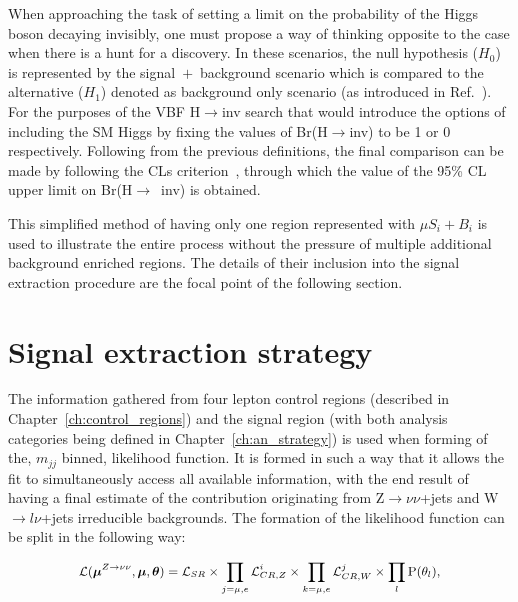 \hspace{10pt} When approaching the task of setting a limit on the probability of the Higgs boson decaying invisibly, one must propose a way of thinking opposite to the case when there is a hunt for a discovery. In these scenarios, the null hypothesis ($H_0$) is represented by the signal~$+$~background scenario which is compared to the alternative ($H_1$) denoted as background only scenario (as introduced in Ref.~\cite{paper:stat_overview}). For the purposes of the VBF H$\rightarrow$inv search that would introduce the options of including the SM Higgs by fixing the values of Br(H$\rightarrow$inv) to be 1 or 0 respectively. Following from the previous definitions, the final comparison can be made by following the CLs criterion~\cite{paper:stat_overview,paper:cls_intro}, through which the value of the 95\% CL upper limit on Br(H$\rightarrow$~inv) is obtained.

\hspace{10pt} This simplified method of having only one region represented with $\mu S_i+B_i$ is used to illustrate the entire process without the pressure of multiple additional background enriched regions. The details of their inclusion into the signal extraction procedure are the focal point of the following section.
\section{Signal extraction strategy}
\hspace{10pt} The information gathered from four lepton control regions (described in Chapter~\ref{ch:control_regions}) and the signal region (with both analysis categories being defined in Chapter~\ref{ch:an_strategy}) is used when forming of the, $m_{jj}$ binned, likelihood function. It is formed in such a way that it allows the fit to simultaneously access all available information, with the end result of having a final estimate of the contribution originating from Z$\rightarrow \nu\nu$+jets and W$\rightarrow l\nu$+jets irreducible backgrounds. The formation of the likelihood function can be split in the following way:

\begin{equation}
   \small{ \mathcal{L}(\boldsymbol{\mu}^{Z\rightarrow \nu\nu}, \boldsymbol{\mu}, \boldsymbol{\theta}) =  \mathcal{L}_{SR}\times \prod_{j = \mu, e} \mathcal{L}_{CR,Z}^i \times \prod_{k = \mu, e} \mathcal{L}_{CR,W}^j\times\prod_{l}\text{P}(\theta_l) ,}
    \label{eq:likelihood_total}
\end{equation}

